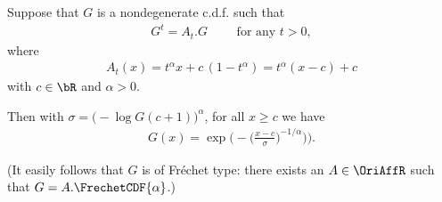 \begin{lemma}
  \label{lem:characterization-self-similar-family-pos-index}
  \leanok
  Suppose that $G$ is a nondegenerate c.d.f. such that
  \begin{align*}
    G^{t} = A_t . G \qquad \text{ for any } t > 0 ,
  \end{align*}
  where
  \begin{align*}
    A_t(x) = t^{\alpha} x + c \, (1 - t^{\alpha}) = t^{\alpha} (x-c) + c
  \end{align*}
  with $c \in \bR$ and $\alpha > 0$.

  Then with $\sigma = \big(- \log G(c+1)\big)^{\alpha}$,
  for all $x \ge c$ we have
  \begin{align*}
    G(x) = \exp \Big( - \big( \frac{x - c}{\sigma} \big)^{-1/\alpha} \big) \Big) .
  \end{align*}

  (It easily follows that $G$ is of Fr\'echet type: there exists
  an $A \in \OriAffR$ such that $G = A.\FrechetCDF{\alpha}$.)
\end{lemma}

